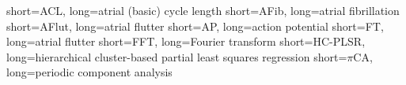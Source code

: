 


\usepackage{enumitem}
\newlength\myitemwidth

\setlength\myitemwidth{9em} 						%






  		{short={ACL},		long={atrial (basic) cycle length}}
  		{short={AFib},		long={atrial fibrillation}}
  		{short={AFlut},		long={atrial flutter}}
  		{short={AP},			long={action potential}}
  		{short={FT},			long={atrial flutter}}
  		{short={FFT},		long={Fourier transform}}
  	{short={HC-PLSR},	long={hierarchical cluster-based partial least squares regression}}
  		{short={$\pi$CA},	long={periodic component analysis}}
